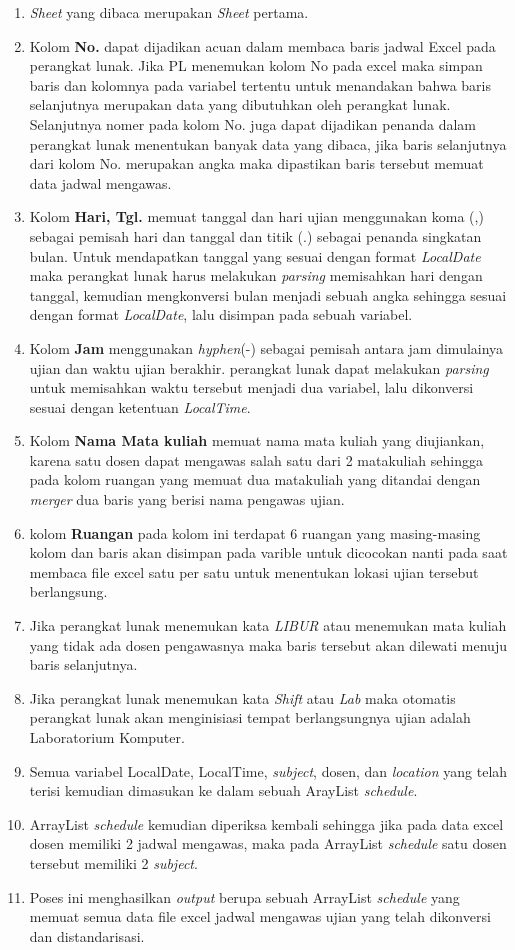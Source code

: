 \begin{enumerate}
	\item \textit{Sheet} yang dibaca merupakan \textit{Sheet} pertama.
	\item Kolom \textbf{No.} dapat dijadikan acuan dalam membaca baris jadwal Excel pada perangkat lunak. Jika PL menemukan kolom No pada excel maka simpan baris dan kolomnya pada variabel tertentu untuk menandakan bahwa baris selanjutnya merupakan data yang dibutuhkan oleh perangkat lunak. Selanjutnya nomer pada kolom No. juga dapat dijadikan penanda dalam perangkat lunak menentukan banyak data yang dibaca, jika baris selanjutnya dari kolom No. merupakan angka maka dipastikan baris tersebut memuat data jadwal mengawas.
		\item Kolom \textbf{Hari, Tgl.} memuat tanggal dan hari ujian menggunakan koma (,) sebagai pemisah hari dan tanggal dan titik (.) sebagai penanda singkatan bulan. Untuk mendapatkan tanggal yang sesuai dengan format \textit{LocalDate} maka perangkat lunak harus melakukan \textit{parsing} memisahkan hari dengan tanggal, kemudian mengkonversi bulan menjadi sebuah angka sehingga sesuai dengan format \textit{LocalDate}, lalu disimpan pada sebuah variabel.
		\item Kolom \textbf{Jam} menggunakan \textit{hyphen}(-) sebagai pemisah antara jam dimulainya ujian dan waktu ujian berakhir. perangkat lunak dapat melakukan \textit{parsing} untuk memisahkan waktu tersebut menjadi dua variabel, lalu dikonversi sesuai dengan ketentuan \textit{LocalTime}.
		\item Kolom \textbf{Nama Mata kuliah} memuat nama mata kuliah yang diujiankan, karena satu dosen dapat mengawas salah satu dari 2 matakuliah sehingga pada kolom ruangan yang memuat dua matakuliah yang ditandai dengan \textit{merger} dua baris yang berisi nama pengawas ujian.
		\item kolom \textbf{Ruangan} pada kolom ini terdapat 6 ruangan yang masing-masing kolom dan baris akan disimpan pada varible untuk dicocokan nanti pada saat membaca file excel satu per satu untuk menentukan lokasi ujian tersebut berlangsung.
		\item Jika perangkat lunak menemukan kata \textit{LIBUR} atau menemukan mata kuliah yang tidak ada dosen pengawasnya maka baris tersebut akan dilewati menuju baris selanjutnya.
		\item Jika perangkat lunak menemukan kata \textit{Shift} atau \textit{Lab} maka otomatis perangkat lunak akan menginisiasi tempat berlangsungnya ujian adalah Laboratorium Komputer.
		\item Semua variabel LocalDate, LocalTime, \textit{subject}, dosen, dan \textit{location} yang telah terisi kemudian dimasukan ke dalam sebuah ArayList \textit{schedule}.
		\item ArrayList \textit{schedule} kemudian diperiksa kembali sehingga jika pada data excel dosen memiliki 2 jadwal mengawas, maka pada ArrayList \textit{schedule} satu dosen tersebut memiliki 2 \textit{subject}.
		\item Poses ini menghasilkan \textit{output} berupa sebuah ArrayList \textit{schedule} yang memuat semua data file excel jadwal mengawas ujian yang telah dikonversi dan distandarisasi. 
\end{enumerate}

